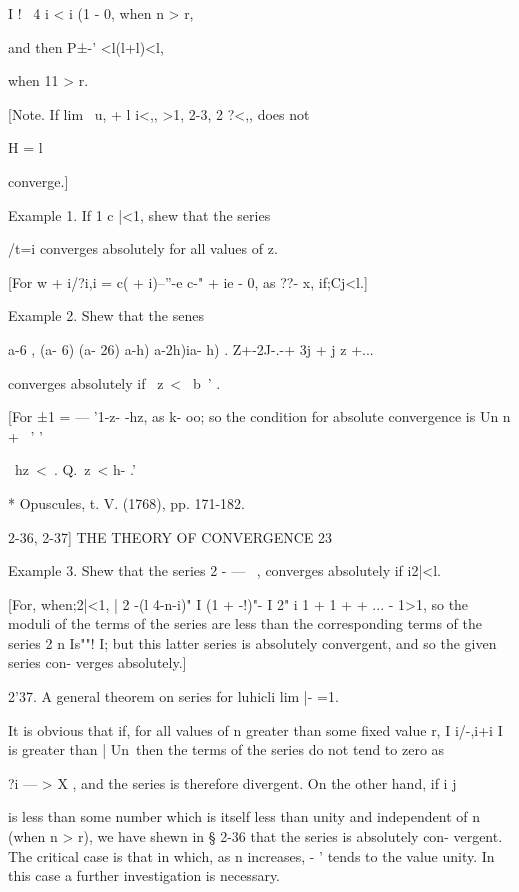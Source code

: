 I ! \ 4 i < i (1 - 0, when n > r,



and then P±-' <l(l+l)<l,

when 11 > r.

[Note. If lim \ u, + l i<,, >1, %
2-3, 2 ?<,, does not

H = l

converge.]

Example 1. If 1 c |<1, shew that the series

/t=i converges absolutely for all values of z.

[For w + i/?i,i = c( + i)--''-e c-" + ie - 0, as ??- x, if;Cj<l.]

Example 2. Shew that the senes



a-6 , (a- 6) (a- 26) a-h) a-2h)ia- h) . Z+-2J-.-+ 3j + j z +...

converges absolutely if \ z\ < \ b~' .



[For ±1 = — '1-z- -hz, as k- oo; so the condition for absolute
convergence is Un n + \ ' '

\ hz\ < \,. Q.\ z\ < h- .'\

* Opuscules, t. V. (1768), pp. 171-182.



2-36, 2-37] THE THEORY OF CONVERGENCE 23

Example 3. Shew that the series 2 - — \ , converges absolutely if
i2|<l.

[For, when;2|<1, | 2 -(l 4-n-i)" I (1 + -!)"- I 2" i 1 + 1 + + ... -
1>1, so the moduli of the terms of the series are less than the
corresponding terms of the series 2 n Is""! I; but this latter series
is absolutely convergent, and so the given series con- verges
absolutely.]

2'37. A general theorem on series for luhicli lim |- =1.

It is obvious that if, for all values of n greater than some fixed
value r, I i/-,i+i I is greater than | Un\, then the terms of the
series do not tend to zero as

?i — > X , and the series is therefore divergent. On the other hand,
if i j

is less than some number which is itself less than unity and
independent of n (when n > r), we have shewn in § 2-36 that the series
is absolutely con- vergent. The critical case is that in which, as n
increases, - ' tends to the value unity. In this case a further
investigation is necessary.

